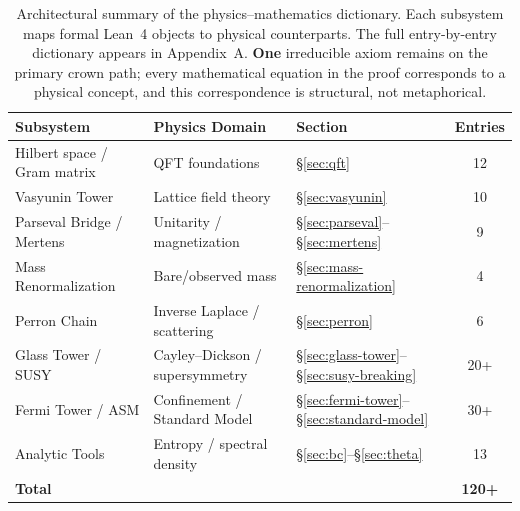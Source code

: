 \documentclass[11pt,a4paper]{article}
\begin{document}
\begin{table}[H]
\centering
\small
\begin{tabular}{@{}lllc@{}}
\toprule
\textbf{Subsystem} & \textbf{Physics Domain} & \textbf{Section} & \textbf{Entries} \\
\midrule
Hilbert space / Gram matrix & QFT foundations & \S\ref{sec:qft} & 12 \\
Vasyunin Tower & Lattice field theory & \S\ref{sec:vasyunin} & 10 \\
Parseval Bridge / Mertens & Unitarity / magnetization & \S\ref{sec:parseval}--\S\ref{sec:mertens} & 9 \\
Mass Renormalization & Bare/observed mass & \S\ref{sec:mass-renormalization} & 4 \\
Perron Chain & Inverse Laplace / scattering & \S\ref{sec:perron} & 6 \\
Glass Tower / SUSY & Cayley--Dickson / supersymmetry & \S\ref{sec:glass-tower}--\S\ref{sec:susy-breaking} & 20+ \\
Fermi Tower / ASM & Confinement / Standard Model & \S\ref{sec:fermi-tower}--\S\ref{sec:standard-model} & 30+ \\
Analytic Tools & Entropy / spectral density & \S\ref{sec:bc}--\S\ref{sec:theta} & 13 \\
\midrule
\textbf{Total} & & & \textbf{120+} \\
\bottomrule
\end{tabular}
\caption{Architectural summary of the physics--mathematics dictionary.
Each subsystem maps formal Lean~4 objects to physical counterparts.
The full entry-by-entry dictionary appears in Appendix~A.
\textbf{One} irreducible axiom remains on the primary crown path;
every mathematical equation in the proof corresponds to a physical
concept, and this correspondence is structural, not metaphorical.}
\label{tab:architecture-summary}
\end{table}





\end{document}
